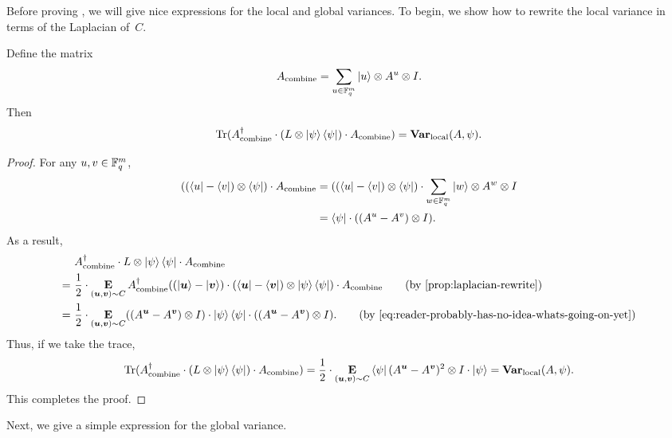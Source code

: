 Before proving ,
we will give nice expressions for the local and global variances.
To begin, we show how to rewrite the local variance in terms of the Laplacian of~$C$.

\begin{lemma}\label{lem:local-rewrite}
Define the matrix
\begin{equation*}
A_{\mathrm{combine}} = \sum_{u \in \mathbb F_q^m} \ket{u} \otimes A^u \otimes I.
\end{equation*}
Then
\begin{equation*}
\mathrm{Tr}(A_{\mathrm{combine}}^\dagger \cdot (L \otimes \ket{\psi}\bra{\psi}) \cdot A_{\mathrm{combine}})= \mathbf{Var}_{\mathrm{local}}(A, \psi).
\end{equation*}
\end{lemma}
\begin{proof}
For any $u, v \in \mathbb F_q^m$,
\begin{align}
((\bra{u} - \bra{v}) \otimes \bra{\psi})\cdot A_{\mathrm{combine}}
&= ((\bra{u} - \bra{v}) \otimes \bra{\psi})\cdot \sum_{w \in \mathbb F_q^m} \ket{w} \otimes A^w \otimes I\nonumber\\
&=  \bra{\psi}\cdot  ((A^u- A^v) \otimes I).\label{eq:reader-probably-has-no-idea-whats-going-on-yet}
\end{align}
As a result,
\begin{align*}
&A_{\mathrm{combine}}^\dagger \cdot L \otimes \ket{\psi}\bra{\psi} \cdot A_{\mathrm{combine}}\\
=~& \frac{1}{2} \cdot \E_{(\bu, \bv) \sim C} A_{\mathrm{combine}}^\dagger ((\ket{\bu} - \ket{\bv}) \cdot (\bra{\bu} - \bra{\bv})\otimes \ket{\psi} \bra{\psi})\cdot A_{\mathrm{combine}}\tag{by \Cref{prop:laplacian-rewrite}}\\
=~&  \frac{1}{2} \cdot \E_{(\bu, \bv) \sim C} ((A^{\bu} - A^{\bv}) \otimes I) \cdot \ket{\psi}\bra{\psi} \cdot ((A^{\bu} - A^{\bv}) \otimes I). \tag{by \eqref{eq:reader-probably-has-no-idea-whats-going-on-yet}}
\end{align*}
Thus, if we take the trace,
\begin{equation*}
\mathrm{Tr}(A_{\mathrm{combine}}^\dagger \cdot (L \otimes \ket{\psi}\bra{\psi}) \cdot A_{\mathrm{combine}})
= \frac{1}{2} \cdot \mathop{\bf E\/}_{(\boldsymbol{u}, \boldsymbol{v}) \sim C} \bra{\psi} (A^{\boldsymbol{u}} - A^{\boldsymbol{v}})^2 \otimes I \cdot \ket{\psi}
= \mathbf{Var}_{\mathrm{local}}(A, \psi).
\end{equation*}
This completes the proof.
\end{proof}

Next, we give a simple expression for the global variance.

